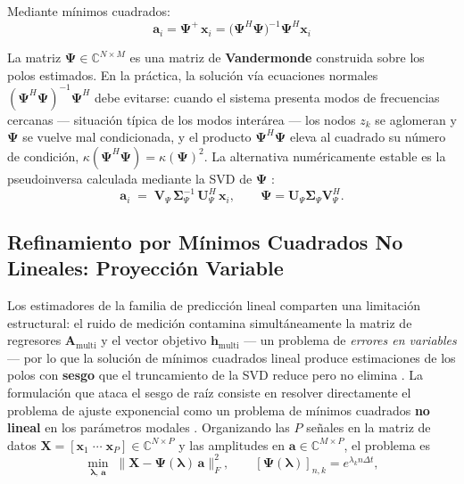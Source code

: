Mediante mínimos cuadrados:
\begin{equation}
\mathbf{a}_i = \boldsymbol{\Psi}^+\,\mathbf{x}_i
= \bigl(\boldsymbol{\Psi}^H\boldsymbol{\Psi}\bigr)^{-1}\boldsymbol{\Psi}^H\mathbf{x}_i
\end{equation}

La matriz $\boldsymbol{\Psi}\in\mathbb{C}^{N\times M}$ es una matriz de
\textbf{Vandermonde} construida sobre los polos estimados. En la práctica,
la solución vía ecuaciones normales
$(\boldsymbol{\Psi}^H\boldsymbol{\Psi})^{-1}\boldsymbol{\Psi}^H$ debe
evitarse: cuando el sistema presenta modos de frecuencias cercanas ---
situación típica de los modos interárea --- los nodos $z_k$ se aglomeran y
$\boldsymbol{\Psi}$ se vuelve mal condicionada, y el producto
$\boldsymbol{\Psi}^H\boldsymbol{\Psi}$ eleva al cuadrado su número de
condición, $\kappa(\boldsymbol{\Psi}^H\boldsymbol{\Psi}) =
\kappa(\boldsymbol{\Psi})^2$. La alternativa numéricamente estable es la
pseudoinversa calculada mediante la SVD de $\boldsymbol{\Psi}$
\cite{brunton2022}:
\begin{equation}
    \mathbf{a}_i \;=\;
    \mathbf{V}_{\Psi}\,\boldsymbol{\Sigma}_{\Psi}^{-1}\,
    \mathbf{U}_{\Psi}^{H}\,\mathbf{x}_i,
    \qquad
    \boldsymbol{\Psi} =
    \mathbf{U}_{\Psi}\boldsymbol{\Sigma}_{\Psi}\mathbf{V}_{\Psi}^{H}.
    \label{eq:amp_svd}
\end{equation}

\subsection{Refinamiento por Mínimos Cuadrados No Lineales: Proyección
Variable}

Los estimadores de la familia de predicción lineal comparten una limitación
estructural: el ruido de medición contamina simultáneamente la matriz de
regresores $\mathbf{A}_{\mathrm{multi}}$ y el vector objetivo
$\mathbf{h}_{\mathrm{multi}}$ --- un problema de \textit{errores en
variables} --- por lo que la solución de mínimos cuadrados lineal produce
estimaciones de los polos con \textbf{sesgo} que el truncamiento de la SVD
reduce pero no elimina \cite{brunton2022}. La formulación que ataca el
sesgo de raíz consiste en resolver directamente el problema de ajuste
exponencial como un problema de mínimos cuadrados \textbf{no lineal} en los
parámetros modales \cite{askham2018,brunton2022}. Organizando las $P$
señales en la matriz de datos
$\mathbf{X} = [\mathbf{x}_1\;\cdots\;\mathbf{x}_P] \in \mathbb{C}^{N\times P}$
y las amplitudes en $\mathbf{a} \in \mathbb{C}^{M\times P}$, el problema es
\begin{equation}
    \min_{\boldsymbol{\lambda},\,\mathbf{a}}\;
    \bigl\lVert \mathbf{X} -
    \boldsymbol{\Psi}(\boldsymbol{\lambda})\,\mathbf{a} \bigr\rVert_F^2,
    \qquad
    [\boldsymbol{\Psi}(\boldsymbol{\lambda})]_{n,k} = e^{\lambda_k n \Delta t},
    \label{eq:varpro_problem}
\end{equation}

